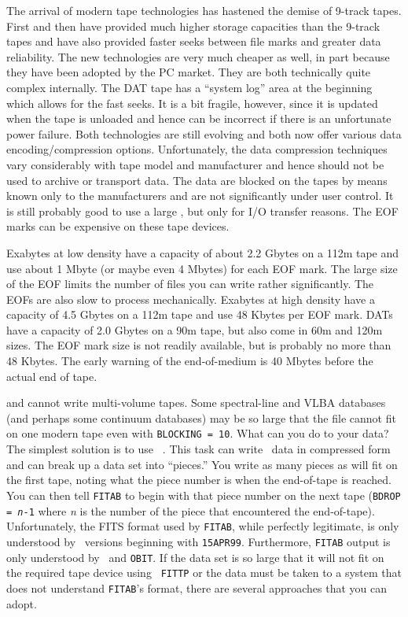      The arrival of modern tape technologies has hastened the demise
of 9-track tapes.  First  and then  have provided much higher storage capacities than the 9-track
tapes and have also provided faster seeks between file marks and
greater data reliability.  The new technologies are very much cheaper
as well, in part because they have been adopted by the PC market.
They are both technically quite complex internally.  The DAT tape has
a ``system log'' area at the beginning which allows for the fast
seeks.  It is a bit fragile, however, since it is updated when the
tape is unloaded and hence can be incorrect if there is an unfortunate
power failure.  Both technologies are still evolving and both now
offer various data encoding/compression options.  Unfortunately, the
data compression techniques vary considerably with tape model and
manufacturer and hence should not be used to archive or transport
data.  The data are blocked on the tapes by means known only to the
manufacturers and are not significantly under user control.  It is
still probably good to use a large {\tt {}}, but only for
I/O transfer reasons.  The EOF marks can be expensive on these tape
devices.

      Exabytes at low density have a capacity of about 2.2 Gbytes on a
112m tape and use about 1 Mbyte (or maybe even 4 Mbytes) for each EOF
mark.  The large size of the EOF limits the number of files you can
write rather significantly.  The EOFs are also slow to process
mechanically.  Exabytes at high density have a capacity of 4.5 Gbytes
on a 112m tape and use 48 Kbytes per EOF mark.  DATs have a capacity
of 2.0 Gbytes on a 90m tape, but also come in 60m and 120m sizes.  The
EOF mark size is not readily available, but is probably no more than
48 Kbytes.  The early warning of the end-of-medium is 40 Mbytes before
the actual end of tape.


     {\tt {}} and {\tt {}} cannot write
multi-volume tapes.  Some spectral-line and VLBA databases (and
perhaps some continuum databases) may be so large that the file cannot
fit on one modern tape even with {\tt BLOCKING = 10}.  What can you do
to  your data?  The simplest solution is to use {\tt
{}}\@.  This task can write \uv\ data in compressed form and
can break up a data set into ``pieces.''  You write as many pieces as
will fit on the first tape, noting what the piece number is when the
end-of-tape is reached.  You can then tell {\tt FITAB} to begin with
that piece number on the next tape ({\tt BDROP = {\it n\/}-1} where
{\it n\/} is the number of the piece that encountered the
end-of-tape).  Unfortunately, the FITS format used by {\tt FITAB},
while perfectly legitimate, is only understood by \AIPS\ versions
beginning with {\tt 15APR99}\@.  Furthermore, {\tt FITAB} output is
only understood by \AIPS\ and {\tt OBIT}\@.  If the data set is so
large that it will not fit on the required tape device using {\tt
FITTP} or the data must be taken to a system that does not understand
{\tt FITAB}'s format, there are several approaches that you can adopt.

